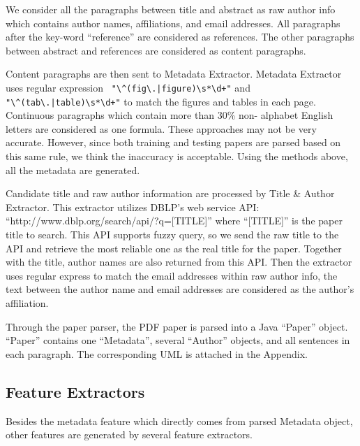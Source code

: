 \documentclass[11pt,letterpaper]{article}
\begin{document}
We consider all the paragraphs between title and abstract as raw author info which contains author names, affiliations, and email addresses. All paragraphs after the key-word “reference” are considered as references. The other paragraphs between abstract and references are considered as content paragraphs. 

Content paragraphs are then sent to Metadata Extractor. 
Metadata Extractor uses regular expression \verb- "\^(fig\.|figure)\s*\d+"- and  \verb-"\^(tab\.|table)\s*\d+"- to match the figures and tables in each page. Continuous paragraphs which contain more than 30\% non- alphabet English letters are considered as one formula. These approaches may not be very accurate. However, since both training and testing papers are parsed based on this same rule, we think the inaccuracy is acceptable. Using the methods above, all the metadata are generated. 

Candidate title and raw author information are processed by Title \& Author Extractor. This extractor utilizes DBLP’s web service API: 
“http://www.dblp.org/search/api/?q=[TITLE]”  
where “[TITLE]” is the paper title to search. This API supports fuzzy query, so we send the raw title to the API and retrieve the most reliable one as the real title for the paper. Together with the title, author names are also returned from this API. Then the extractor uses regular express to match the email addresses within raw author info, the text between the author name and email addresses are considered as the author’s affiliation. 

Through the paper parser, the PDF paper is parsed into a Java “Paper” object. “Paper” contains one “Metadata”, several “Author” objects, and all sentences in each paragraph. The corresponding UML is attached in the Appendix. 


\subsection{Feature Extractors}
Besides the metadata feature which directly comes from parsed Metadata object, other features are generated by several feature extractors. 
\end{document}

